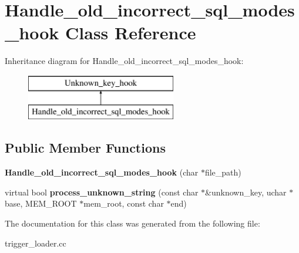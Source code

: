 \hypertarget{classHandle__old__incorrect__sql__modes__hook}{}\section{Handle\+\_\+old\+\_\+incorrect\+\_\+sql\+\_\+modes\+\_\+hook Class Reference}
\label{classHandle__old__incorrect__sql__modes__hook}
Inheritance diagram for Handle\+\_\+old\+\_\+incorrect\+\_\+sql\+\_\+modes\+\_\+hook\+:\begin{figure}[H]
\begin{center}
\leavevmode
\includegraphics[height=2.000000cm]{classHandle__old__incorrect__sql__modes__hook}
\end{center}
\end{figure}
\subsection*{Public Member Functions}
\begin{DoxyCompactItemize}
\item 
\mbox{\label{classHandle__old__incorrect__sql__modes__hook_a49044b1a2ca5247fc02e9431b7d075bf}} 
{\bfseries Handle\+\_\+old\+\_\+incorrect\+\_\+sql\+\_\+modes\+\_\+hook} (char $\ast$file\+\_\+path)
\item 
\mbox{\label{classHandle__old__incorrect__sql__modes__hook_ade9970e26730bd92b8d9a46d343f88aa}} 
virtual bool {\bfseries process\+\_\+unknown\+\_\+string} (const char $\ast$\&unknown\+\_\+key, uchar $\ast$base, M\+E\+M\+\_\+\+R\+O\+OT $\ast$mem\+\_\+root, const char $\ast$end)
\end{DoxyCompactItemize}


The documentation for this class was generated from the following file\+:\begin{DoxyCompactItemize}
\item 
trigger\+\_\+loader.\+cc\end{DoxyCompactItemize}
